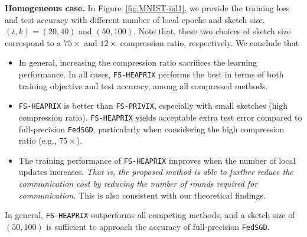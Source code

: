 \documentclass[sigconf, anonymous, review]{acmart}
\begin{document}
\textbf{Homogeneous case.} In Figure~\ref{fig:MNIST-iid1}, we provide the training loss and test accuracy with different number of local epochs and sketch size, $(t,k)=(20,40)$ and $(50,100)$. 
Note that, these two choices of sketch size correspond to a $75\times$ and $12\times$ compression ratio, respectively. We conclude that
\begin{itemize}
    \item In general, increasing the compression ratio sacrifices the learning performance. In all cases, \texttt{FS-HEAPRIX} performs the best in terms of both training objective and test accuracy, among all compressed methods.
    
    \item \texttt{FS-HEAPRIX} is better than \texttt{FS-PRIVIX}, especially with small sketches (high compression ratio). \texttt{FS-HEAPRIX} yields acceptable extra test error compared to full-precision \texttt{FedSGD}, particularly when considering the high compression ratio (e.g., $75\times$). 
    
    \item The training performance of \texttt{FS-HEAPRIX} improves when the number of local updates increases. \emph{That is, the proposed method is able to further reduce the communication cost by reducing the number of rounds required for communication.} This is also consistent with our theoretical findings. 
\end{itemize}
In general, \texttt{FS-HEAPRIX} outperforms all competing methods, and a sketch size of $(50,100)$ is sufficient to approach the accuracy of full-precision \texttt{FedSGD}.
\end{document}

